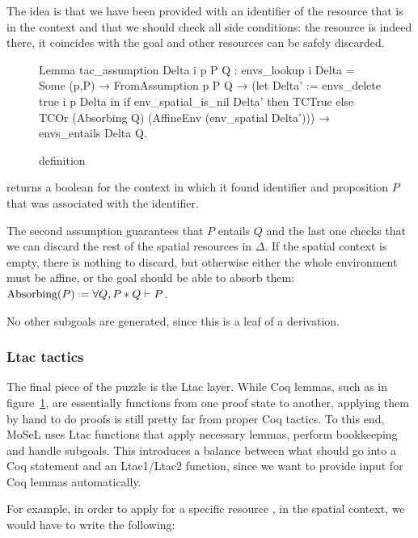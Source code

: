 The idea is that we have been provided with an identifier of the resource that is in the context and that we should check all side conditions: the resource is indeed there, it coincides with the goal and other resources can be safely discarded.

\begin{figure}[H]
\begin{coq}
Lemma tac_assumption Delta i p P Q :
  envs_lookup i Delta = Some (p,P) →
  FromAssumption p P Q →
  (let Delta' := envs_delete true i p Delta in
   if env_spatial_is_nil Delta' then TCTrue
   else TCOr (Absorbing Q) (AffineEnv (env_spatial Delta'))) →
  envs_entails Delta Q.
\end{coq}
\caption{ definition}
\label{fig:tac-assumption}
\end{figure}

 returns a boolean for the context in which it found identifier  and proposition \(P\) that was associated with the identifier.

The second assumption guarantees that \(P\) entails \(Q\) and the last one checks that we can discard the rest of the spatial resources in \(\Delta\).
If the spatial context is empty, there is nothing to discard, but otherwise either the whole environment must be affine, or the goal should be able to absorb them:
\(\Absorbing P \defeq \forall Q, P * Q \vdash P\).

No other subgoals are generated, since this is a leaf of a derivation.

\subsubsection{Ltac tactics}
\label{sec:ltac1-tactics}

The final piece of the puzzle is the Ltac layer.
While Coq lemmas, such as in figure~\ref{fig:tac-assumption}, are essentially functions from one proof state to another, applying them by hand to do proofs is still pretty far from proper Coq tactics.
To this end, MoSeL uses Ltac functions that apply necessary lemmas, perform bookkeeping and handle subgoals.
This introduces a balance between what should go into a Coq statement and an Ltac1/Ltac2 function, since we want to provide input for Coq lemmas automatically.

For example, in order to apply  for a specific resource , in the spatial context, we would have to write the following:

